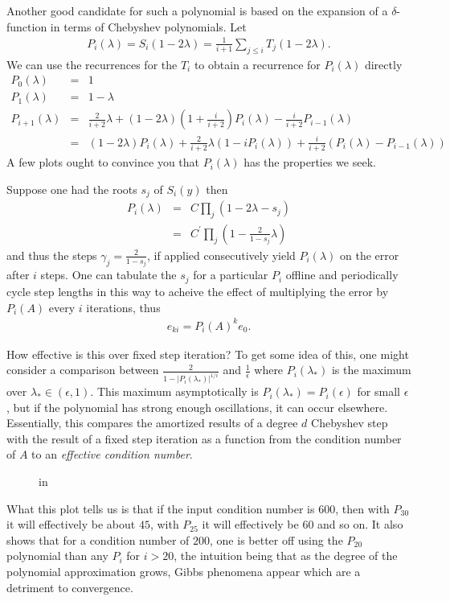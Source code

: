 \documentclass{article}
\newcommand{\beas}{\begin{eqnarray*}}
\newcommand{\enas}{\end{eqnarray*}}
\begin{document}
Another good candidate for such a polynomial is based on
the expansion of a $\delta$-function in terms of Chebyshev polynomials.
Let
\beas
P_i(\lambda) = S_i(1 - 2 \lambda) =
\frac{1}{i+1} \sum_{j\le i} T_j (1-2\lambda).
\enas
We can use the recurrences for the $T_i$ to
obtain a recurrence for $P_i(\lambda)$ directly
\beas
P_0(\lambda) &=& 1\\
P_1(\lambda) &=& 1-\lambda\\
P_{i+1}(\lambda)
 &=& \frac{2}{i+2} \lambda + 
(1-2\lambda) \left(1+\frac{i}{i+2}\right) P_{i}(\lambda)
- \frac{i}{i+2} P_{i-1}(\lambda)\\
 &=&
(1-2\lambda) P_{i}(\lambda)
+ \frac{2}{i+2} \lambda (1 - i P_{i}(\lambda))
+ \frac{i}{i+2} (P_{i}(\lambda)- P_{i-1}(\lambda))
\enas
A few plots ought to convince you that $P_i(\lambda)$ has the
properties we seek.

Suppose one had the roots $s_j$ of $S_i(y)$ then
\beas
P_i(\lambda) &=& C \prod_j \left( 1 - 2 \lambda - s_j\right)\\
             &=& C^\prime \prod_j \left( 1 - \frac{2}{1-s_j} \lambda \right)
\enas
and thus the steps $\gamma_j = \frac{2}{1-s_j}$, if applied consecutively
yield $P_i(\lambda)$ on the error after $i$ steps.  One
can tabulate the $s_j$ for a particular $P_i$ offline and
periodically cycle step lengths in this way to acheive the effect of
multiplying the error by $P_i(A)$ every $i$ iterations, thus
\beas
  e_{ki} = P_i(A)^k e_0.
\enas

How effective is this over fixed step iteration?  To get some idea of
this, one might consider a comparison between
$\frac{2}{1-\left|P_i(\lambda_*)\right|^{1/i}}$ and $\frac{1}{\epsilon}$
where $P_i(\lambda_*)$ is the maximum over
$\lambda_* \in (\epsilon,1)$.  This maximum asymptotically is
$P_i(\lambda_*) = P_i(\epsilon)$ for small $\epsilon$, but if the
polynomial has strong enough oscillations, it can occur elsewhere.
Essentially, this compares the amortized results of a degree $d$
Chebyshev step with the result of a fixed step iteration as a function
from the condition number of $A$ to an {\em effective condition number}.
\begin{figure}
\begin{center}
 in 
\end{center}
\end{figure}
What this plot tells us is that if the input condition
number is $600$, then with $P_{30}$ it will effectively be about $45$,
with $P_{25}$ it will effectively be $60$ and so on.  It also shows that
for a condition number of $200$, one is better off using the
$P_{20}$ polynomial than any $P_i$ for $i>20$, the intuition being
that as the degree of the polynomial approximation grows, Gibbs
phenomena appear which are a detriment to convergence.
\end{document}
